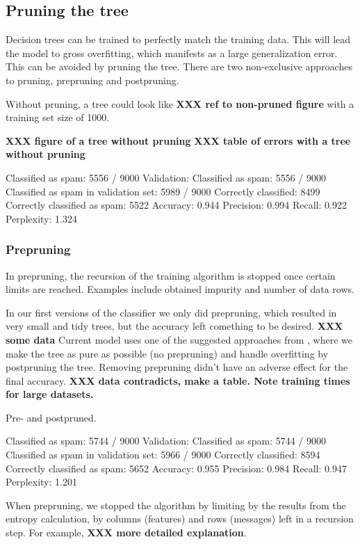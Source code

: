 \documentclass[a4paper,10pt]{article}
\newcommand{\XXX}[1]{{\bf XXX #1}}
\begin{document}
\subsection{Pruning the tree}

Decision trees can be trained to perfectly match the training
data\cite[\XXX{page number}]{alpaydin2004}.  This will lead the model to
gross overfitting, which manifests as a large generalization error.
This can be avoided by pruning the tree.  There are two non-exclusive
approaches to pruning, prepruning and postpruning.

Without pruning, a tree could look like \XXX{ref to non-pruned figure}
with a training set size of 1000.  

\XXX{figure of a tree without pruning}
\XXX{table of errors with a tree without pruning}

Classified as spam: 5556 / 9000
Validation:
 Classified as spam: 5556 / 9000
 Classified as spam in validation set: 5989 / 9000
 Correctly classified: 8499
 Correctly classified as spam: 5522
 Accuracy: 0.944
 Precision: 0.994
 Recall: 0.922
 Perplexity: 1.324

\subsubsection{Prepruning}

In prepruning, the recursion of the training algorithm is stopped once
certain limits are reached.  Examples include obtained impurity and number
of data rows.

In our first versions of the classifier we only did prepruning, which
resulted in very small and tidy trees, but the accuracy left comething
to be desired. \XXX{some data} Current model uses one of the suggested
approaches from \cite{alpaydin2004}, where we make the tree as pure as
possible (no prepruning) and handle overfitting by postpruning the tree.
Removing prepruning didn't have an adverse effect for the final
accuracy. \XXX{data contradicts, make a table.  Note training times for
  large datasets.}

Pre- and postpruned.

Classified as spam: 5744 / 9000
Validation:
 Classified as spam: 5744 / 9000
 Classified as spam in validation set: 5966 / 9000
 Correctly classified: 8594
 Correctly classified as spam: 5652
 Accuracy: 0.955
 Precision: 0.984
 Recall: 0.947
 Perplexity: 1.201

When prepruning, we stopped the algorithm by limiting by the results
from the entropy calculation, by columns (features) and rows (messages)
left in a recursion step.  For example, \XXX{more detailed explanation}.
\end{document}

